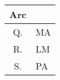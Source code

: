 \begin{tabular}[12pt]{ |c|l| }
  \hline
  \textbf{Arc} & \\ \hline
  Q. & MA \\ \hline
  R. & LM \\ \hline
  S. & PA \\ \hline
\end{tabular}
